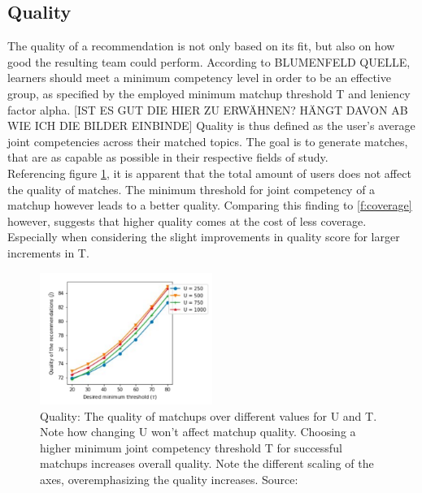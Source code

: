 \documentclass[nochapterpage,bigchapter,linedtoc,longdoc,colorback,accentcolor=tud3b,oneside]{tudreport}
\begin{document}
\subsection{Quality} The quality of a recommendation is not only based on its fit, but also on how good the resulting team could perform. According to BLUMENFELD QUELLE, learners should meet a minimum competency level in order to be an effective group, as specified by the employed minimum matchup threshold T and leniency factor alpha. [IST ES GUT DIE HIER ZU ERWÄHNEN? HÄNGT DAVON AB WIE ICH DIE BILDER EINBINDE] Quality is thus defined as the user's average joint competencies across their matched topics. The goal is to generate matches, that are as capable as possible in their respective fields of study.\\
Referencing figure \ref{f:quality}, it is apparent that the total amount of users does not affect the quality of matches. The minimum threshold for joint competency of a matchup however leads to a better quality. Comparing this finding to \ref{f:coverage} however, suggests that higher quality comes at the cost of less coverage. Especially when considering the slight improvements in quality score for larger increments in T.\\
\begin{figure}[p]
	\centering
	\includegraphics[width=0.5\textwidth]{g/QualityByU.PNG}
	\caption{Quality: The quality of matchups over different values for U and T. Note how changing U won't affect matchup quality. Choosing a higher minimum joint competency threshold T for successful matchups increases overall quality. Note the different scaling of the axes, overemphasizing the quality increases. Source: \cite{potts2018reciprocal}}
	\label{f:quality}
\end{figure}
\end{document}

